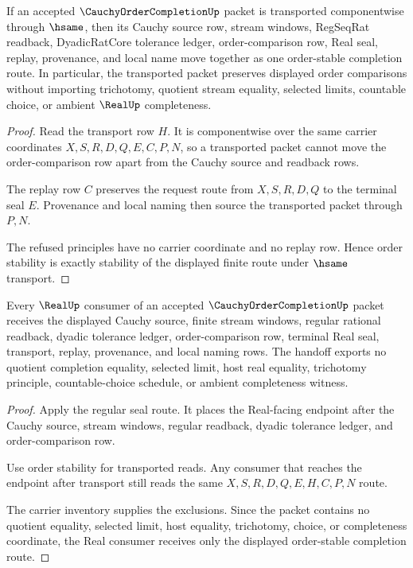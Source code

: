 \begin{theorem}
\label{thm:cauchy-order-completion-order-stability}
If an accepted $\CauchyOrderCompletionUp$ packet is transported componentwise through $\hsame$, then its Cauchy source row, stream windows, RegSeqRat readback, DyadicRatCore tolerance ledger, order-comparison row, Real seal, replay, provenance, and local name move together as one order-stable completion route. In particular, the transported packet preserves displayed order comparisons without importing trichotomy, quotient stream equality, selected limits, countable choice, or ambient $\RealUp$ completeness.
\end{theorem}
\begin{proof}
Read the transport row $H$. It is componentwise over the same carrier coordinates $X,S,R,D,Q,E,C,P,N$, so a transported packet cannot move the order-comparison row apart from the Cauchy source and readback rows.

The replay row $C$ preserves the request route from $X,S,R,D,Q$ to the terminal seal $E$. Provenance and local naming then source the transported packet through $P,N$.

The refused principles have no carrier coordinate and no replay row. Hence order stability is exactly stability of the displayed finite route under $\hsame$ transport.
\end{proof}

\begin{theorem}
\label{thm:cauchy-order-completion-real-consumer-handoff}
Every $\RealUp$ consumer of an accepted $\CauchyOrderCompletionUp$ packet receives the displayed Cauchy source, finite stream windows, regular rational readback, dyadic tolerance ledger, order-comparison row, terminal Real seal, transport, replay, provenance, and local naming rows. The handoff exports no quotient completion equality, selected limit, host real equality, trichotomy principle, countable-choice schedule, or ambient completeness witness.
\end{theorem}
\begin{proof}
Apply the regular seal route. It places the Real-facing endpoint after the Cauchy source, stream windows, regular readback, dyadic tolerance ledger, and order-comparison row.

Use order stability for transported reads. Any consumer that reaches the endpoint after transport still reads the same $X,S,R,D,Q,E,H,C,P,N$ route.

The carrier inventory supplies the exclusions. Since the packet contains no quotient equality, selected limit, host equality, trichotomy, choice, or completeness coordinate, the Real consumer receives only the displayed order-stable completion route.
\end{proof}

